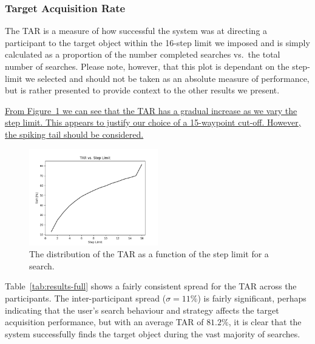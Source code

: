 \documentclass[a4paper, twoside]{article}
\begin{document}
\subsubsection{Target Acquisition Rate}

\noindent The TAR is a measure of how successful the system was at directing a participant to the target object within the 16-step limit we imposed and is simply calculated as a proportion of the number completed searches vs.\ the total number of searches. Please note, however, that this plot is dependant on the step-limit we selected and should not be taken as an absolute measure of performance, but is rather presented to provide context to the other results we present. 

\uline{From Figure~\ref{fig:tar-steps} we can see that the TAR has a gradual increase as we vary the step limit. This appears to justify our choice of a 15-waypoint cut-off. However, the spiking tail should be considered.  }

\begin{figure}
  \centering
  \includegraphics[width=0.5\textwidth]{figures/cdf_tar_limit.png}
  \caption{The distribution of the TAR as a function of the step limit for a search. }\label{fig:tar-steps}
\end{figure}


Table~\ref{tab:results-full} shows a fairly consistent spread for the TAR across the participants. The inter-participant spread ($\sigma=11\%$) is fairly significant, perhaps indicating that the user's search behaviour and strategy affects the target acquisition performance, but with an average TAR of $81.2\%$, it is clear that the system successfully finds the target object during the vast majority of searches. 
\end{document}
